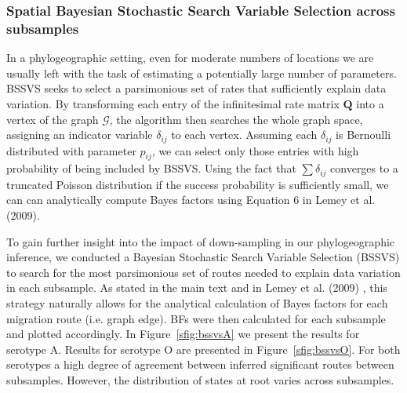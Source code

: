 \documentclass[a4paper,10pt]{article}
\begin{document}
\subsubsection{Spatial Bayesian Stochastic Search Variable Selection across subsamples}

In a phylogeographic setting, even for moderate numbers of locations we are usually left with the task of estimating a potentially large number of parameters. 
BSSVS seeks to select a parsimonious set of rates that sufficiently explain data variation.
By transforming each entry of the infinitesimal rate matrix $\mathbf{Q}$ into a vertex of the graph $\mathcal{G}$, the algorithm then searches the whole graph space, assigning an indicator variable $\delta_{ij}$ to each vertex.
Assuming each $\delta_{ij}$ is Bernoulli distributed with parameter $p_{ij}$, we can select only those entries with high probability of being included by BSSVS.
Using the fact that $\sum\delta_{ij}$ converges to a truncated Poisson distribution if the success probability is sufficiently small, we can can analytically compute Bayes factors using Equation 6 in Lemey et al. (2009).

To gain further insight into the impact of down-sampling in our phylogeographic inference, we conducted a Bayesian Stochastic Search Variable Selection (BSSVS) to search for the most parsimonious set of routes needed to explain data variation in each subsample.
As stated in the main text and in Lemey et al. (2009) \cite{M-roots}, this strategy naturally allows for the analytical calculation of Bayes factors for each migration route (i.e. graph edge).
BFs were then calculated for each subsample and plotted accordingly.
In Figure~\ref{sfig:bssvsA} we present the results for serotype A.
Results for serotype O are presented in Figure~\ref{sfig:bssvsO}.
For both serotypes a high degree of agreement between inferred significant routes between subsamples.
However, the distribution of states at root varies across subsamples.



\newpage

\end{document}
